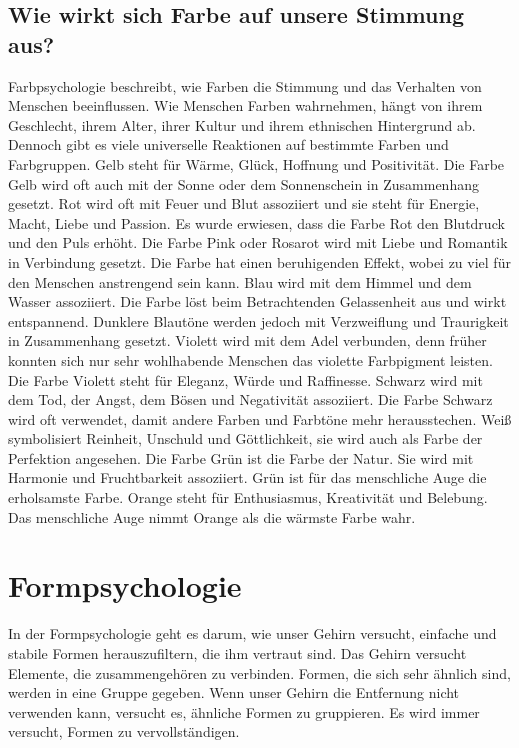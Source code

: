 \subsection{Wie wirkt sich Farbe auf unsere Stimmung aus?}
Farbpsychologie beschreibt, wie Farben die Stimmung und das Verhalten von Menschen beeinflussen. Wie Menschen Farben wahrnehmen, hängt von ihrem Geschlecht, ihrem Alter, ihrer Kultur und ihrem ethnischen Hintergrund ab. Dennoch gibt es viele universelle Reaktionen auf bestimmte Farben und Farbgruppen. 
\cite{_special_subjects}
Gelb steht für Wärme, Glück, Hoffnung und Positivität. Die Farbe Gelb wird oft auch mit der Sonne oder dem Sonnenschein in Zusammenhang gesetzt.\cite{_special_subjects}
Rot wird oft mit Feuer und Blut assoziiert und sie steht für Energie, Macht, Liebe und Passion. Es wurde erwiesen, dass die Farbe Rot den Blutdruck und den Puls erhöht. \cite{_special_subjects}
Die Farbe Pink oder Rosarot wird mit Liebe und Romantik in Verbindung gesetzt. Die Farbe hat einen beruhigenden Effekt, wobei zu viel für den Menschen anstrengend sein kann.\cite{_special_subjects}
Blau wird mit dem Himmel und dem Wasser assoziiert. Die Farbe löst beim Betrachtenden Gelassenheit aus und wirkt entspannend. Dunklere Blautöne werden jedoch mit Verzweiflung und Traurigkeit in Zusammenhang gesetzt. 
Violett wird mit dem Adel verbunden, denn früher konnten sich nur sehr wohlhabende Menschen das violette Farbpigment leisten. Die Farbe Violett steht für Eleganz, Würde und Raffinesse. \cite{_special_subjects}
Schwarz wird mit dem Tod, der Angst, dem Bösen und Negativität assoziiert. Die Farbe Schwarz wird oft verwendet, damit andere Farben und Farbtöne mehr herausstechen. \cite{_special_subjects}
Weiß symbolisiert Reinheit, Unschuld und Göttlichkeit, sie wird auch als Farbe der Perfektion angesehen. \cite{_special_subjects}
Die Farbe Grün ist die Farbe der Natur. Sie wird mit Harmonie und Fruchtbarkeit assoziiert. Grün ist für das menschliche Auge die erholsamste Farbe. \cite{_special_subjects}
Orange steht für Enthusiasmus, Kreativität und Belebung. Das menschliche Auge nimmt Orange als die wärmste Farbe wahr. \cite{_special_subjects}
\cite{_special_subjects}

\section{Formpsychologie}
In der Formpsychologie geht es darum, wie unser Gehirn versucht, einfache und stabile Formen herauszufiltern, die ihm vertraut sind. Das Gehirn versucht Elemente, die zusammengehören zu verbinden. Formen, die sich sehr ähnlich sind, werden in eine Gruppe gegeben. Wenn unser Gehirn die Entfernung nicht verwenden kann, versucht es, ähnliche Formen zu gruppieren. Es wird immer versucht, Formen zu vervollständigen.
\cite{_drawing_basics_and_video_game_art}

